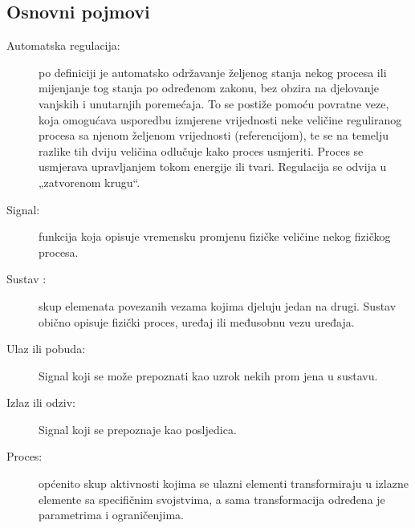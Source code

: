 \documentclass[times, utf8, diplomski]{fer}
\begin{document}
\subsection{Osnovni pojmovi}
\begin{description}
\item[Automatska regulacija:] po definiciji je automatsko održavanje željenog stanja nekog procesa ili  mijenjanje  tog  stanja  po  određenom zakonu,  bez obzira  na  djelovanje  vanjskih  i unutarnjih  poremećaja.  To  se  postiže  pomoću povratne  veze,  koja  omogućava  usporedbu izmjerene  vrijednosti  neke  veličine  reguliranog  procesa  sa  njenom  željenom  vrijednosti (referencijom),  te  se  na  temelju  razlike  tih  dviju veličina  odlučuje  kako  proces  usmjeriti. Proces  se  usmjerava  upravljanjem  tokom  energije  ili tvari. Regulacija se odvija u „zatvorenom krugu“.
\item[Signal:] funkcija koja opisuje vremensku promjenu fizičke veličine nekog fizičkog procesa. 
\item[Sustav :] skup elemenata povezanih vezama kojima djeluju jedan na drugi.  Sustav  obično 
opisuje fizički proces, uređaj ili međusobnu vezu uređaja.
\item[Ulaz ili pobuda:] Signal  koji  se  može  prepoznati  kao  uzrok  nekih  prom
jena  u  sustavu.
\item[Izlaz ili odziv:] Signal koji se prepoznaje kao posljedica.
\item[Proces:] općenito  skup  aktivnosti  kojima  se  ulazni  elementi  transformiraju  u  izlazne elemente  sa  specifičnim  svojstvima,  a  sama    transformacija  određena  je  parametrima  i ograničenjima.
\end{description}  
\end{document}
